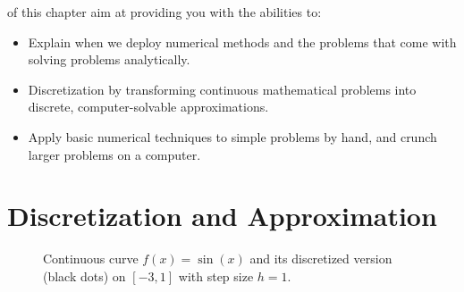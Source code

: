 \vspace{2.5em}
 of this chapter aim at providing you with the abilities to:
\begin{itemize}
    \item Explain when we deploy numerical methods and the problems that come with solving problems analytically.
    \item Discretization by transforming continuous mathematical problems into discrete, computer-solvable approximations.
    \item Apply basic numerical techniques to simple problems by hand, and crunch larger problems on a computer.
\end{itemize}






\newpage
\section{Discretization and Approximation}   


\begin{figure}[h]
    \centering
    \caption{Continuous curve $f(x) = \sin(x)$ and its discretized version (black dots) on $[-3,1]$ with step size $h=1$.}
    \label{fig:discretizationoverlay}
\end{figure}

